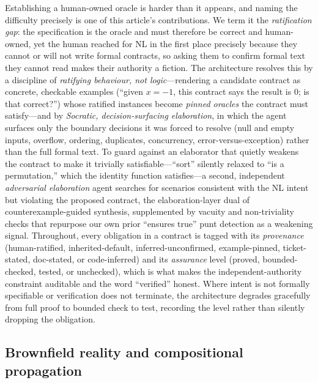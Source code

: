 Establishing a human-owned oracle is harder than it appears, and naming the difficulty precisely is one of this article's contributions. We term it the \emph{ratification gap}: the specification is the oracle and must therefore be correct and human-owned, yet the human reached for NL in the first place precisely because they cannot or will not write formal contracts, so asking them to confirm formal text they cannot read makes their authority a fiction. The architecture resolves this by a discipline of \emph{ratifying behaviour, not logic}---rendering a candidate contract as concrete, checkable examples (``given $x=-1$, this contract says the result is $0$; is that correct?'') whose ratified instances become \emph{pinned oracles} the contract must satisfy---and by \emph{Socratic, decision-surfacing elaboration}, in which the agent surfaces only the boundary decisions it was forced to resolve (null and empty inputs, overflow, ordering, duplicates, concurrency, error-versus-exception) rather than the full formal text. To guard against an elaborator that quietly weakens the contract to make it trivially satisfiable---``sort'' silently relaxed to ``is a permutation,'' which the identity function satisfies---a second, independent \emph{adversarial elaboration} agent searches for scenarios consistent with the NL intent but violating the proposed contract, the elaboration-layer dual of counterexample-guided synthesis, supplemented by vacuity and non-triviality checks that repurpose our own prior ``ensures true'' punt detection as a weakening signal. Throughout, every obligation in a contract is tagged with its \emph{provenance} (human-ratified, inherited-default, inferred-unconfirmed, example-pinned, ticket-stated, doc-stated, or code-inferred) and its \emph{assurance} level (proved, bounded-checked, tested, or unchecked), which is what makes the independent-authority constraint auditable and the word ``verified'' honest. Where intent is not formally specifiable or verification does not terminate, the architecture degrades gracefully from full proof to bounded check to test, recording the level rather than silently dropping the obligation.

\subsection{Brownfield reality and compositional propagation}
\label{subsec:intro-brownfield}

